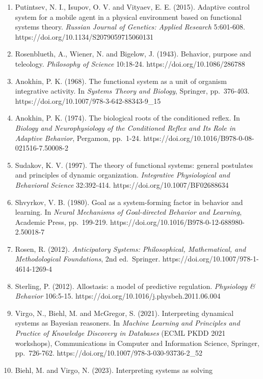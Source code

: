 \documentclass[
  10pt,
]{article}
\begin{document}
\begin{enumerate}
  https://doi.org/10.1016/j.bica.2013.11.005
\item
  Putintsev, N. I., Isupov, O. V. and Vityaev, E. E. (2015). Adaptive
  control system for a mobile agent in a physical environment based on
  functional systems theory. \emph{Russian Journal of Genetics: Applied
  Research} 5:601-608. https://doi.org/10.1134/S2079059715060131
\item
  Rosenblueth, A., Wiener, N. and Bigelow, J. (1943). Behavior, purpose
  and teleology. \emph{Philosophy of Science} 10:18-24.
  https://doi.org/10.1086/286788
\item
  Anokhin, P. K. (1968). The functional system as a unit of organism
  integrative activity. In \emph{Systems Theory and Biology}, Springer,
  pp.~376-403. https://doi.org/10.1007/978-3-642-88343-9\_15
\item
  Anokhin, P. K. (1974). The biological roots of the conditioned reflex.
  In \emph{Biology and Neurophysiology of the Conditioned Reflex and Its
  Role in Adaptive Behavior}, Pergamon, pp.~1-24.
  https://doi.org/10.1016/B978-0-08-021516-7.50008-2
\item
  Sudakov, K. V. (1997). The theory of functional systems: general
  postulates and principles of dynamic organization. \emph{Integrative
  Physiological and Behavioral Science} 32:392-414.
  https://doi.org/10.1007/BF02688634
\item
  Shvyrkov, V. B. (1980). Goal as a system-forming factor in behavior
  and learning. In \emph{Neural Mechanisms of Goal-directed Behavior and
  Learning}, Academic Press, pp.~199-219.
  https://doi.org/10.1016/B978-0-12-688980-2.50018-7
\item
  Rosen, R. (2012). \emph{Anticipatory Systems: Philosophical,
  Mathematical, and Methodological Foundations}, 2nd ed.~Springer.
  https://doi.org/10.1007/978-1-4614-1269-4
\item
  Sterling, P. (2012). Allostasis: a model of predictive regulation.
  \emph{Physiology \& Behavior} 106:5-15.
  https://doi.org/10.1016/j.physbeh.2011.06.004
\item
  Virgo, N., Biehl, M. and McGregor, S. (2021). Interpreting dynamical
  systems as Bayesian reasoners. In \emph{Machine Learning and
  Principles and Practice of Knowledge Discovery in Databases} (ECML
  PKDD 2021 workshops), Communications in Computer and Information
  Science, Springer, pp.~726-762.
  https://doi.org/10.1007/978-3-030-93736-2\_52
\item
  Biehl, M. and Virgo, N. (2023). Interpreting systems as solving

\end{enumerate}
\end{document}
